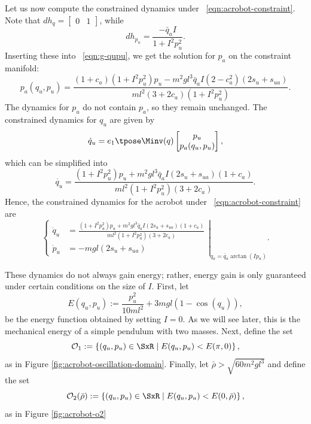Let us now compute the constrained dynamics under
~\eqref{eqn:acrobot-constraint}.
Note that \(dh_q = \begin{bmatrix}0 & 1\end{bmatrix}\), while
\[
    dh_{p_u} = \frac{-\bar{q}_a I}{1 + I^2 p_u^2}
    .
\]
Inserting these into ~\eqref{eqn:g-qupu}, we get the solution for \(p_a\) on the
constraint manifold:
\[
    p_a(q_u,p_u) = \frac{
        (1+c_a)(1+I^2 p_u^2)p_u - m^2gl^3\bar{q}_a I (2-c_a^2)(2s_u + s_{ua})
    }{ml^2(3+2c_a)(1+I^2 p_u^2)}
    .
\]
The dynamics for \(p_u\) do not contain \(p_a\), so they remain unchanged.
The constrained dynamics for \(q_u\) are given by 
\begin{equation*}
    \dot{q}_u = e_1\tpose \Minv(q) \begin{bmatrix}
                    p_u \\ p_a(q_u,p_u)
                \end{bmatrix} %
    ,
\end{equation*}
which can be simplified into 
\begin{equation*}
    \dot{q_u} = \frac{(1+I^2 p_u^2)p_u + m^2gl^3\bar{q}_a I(2s_u + s_{ua})(1+c_a) }{ml^2(1+I^2 p_u^2)(3+2c_a)}
    .
\end{equation*}
Hence, the constrained dynamics for the acrobot under
~\eqref{eqn:acrobot-constraint} are
\begin{equation}\label{eqn:acrobot-constrained-dynamics}
\left.\begin{cases}
    \dot{q}_u &= \frac{(1+I^2 p_u^2)p_u + m^2gl^3\bar{q}_a I(2s_u + s_{ua})(1+c_a) }
            {ml^2(1+I^2 p_u^2)(3+2c_a)}
        \\
    \dot{p}_u &= - m g l (2s_u + s_{ua})
    \end{cases} \right|_{q_a = \bar{q}_a\arctan(Ip_u)}
    .
\end{equation}

These dynamics do not always gain energy; rather, energy gain is only
guaranteed under certain conditions on the size of \(I\).
First, let 
\[
    E(q_u,p_u) := \frac{p_u^2}{10ml^2} + 3mgl(1 - \cos(q_u))
    ,
\]
be the energy function obtained by setting \(I = 0\).
As we will see later, this is the mechanical energy of a simple pendulum with
two masses.
Next, define the set
\begin{equation}\label{eqn:oscillation-domain}
    \mathcal{O}_1 := \left\{(q_u,p_u) \in \SxR 
    \mid E(q_u,p_u) < E(\pi,0) \right\}
    ,
\end{equation}
as in Figure \ref{fig:acrobot-oscillation-domain}.
Finally, let \(\bar{\rho} > \sqrt{60m^2gl^3}\) and define the set
\begin{equation}\label{eqn:o-rhobar}
    \mathcal{O}_2(\bar{\rho}) := \left\{(q_u,p_u) \in \SxR
        \mid E(q_u,p_u) < E(0,\bar{\rho}) \right\}
    ,
\end{equation}
as in Figure \ref{fig:acrobot-o2}

